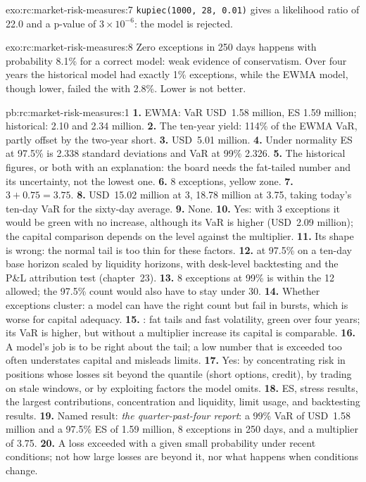 \begin{solution}{exo:rc:market-risk-measures:7}
\texttt{kupiec(1000, 28, 0.01)} gives a likelihood ratio of 22.0 and a p-value of
$3\times10^{-6}$: the model is rejected.
\end{solution}

\begin{solution}{exo:rc:market-risk-measures:8}
Zero exceptions in 250 days happens with probability 8.1\% for a correct model: weak evidence of
conservatism. Over four years the historical model had exactly 1\% exceptions, while the EWMA model,
though lower, failed the  with 2.8\%. Lower is not better.
\end{solution}

\begin{solution}{pb:rc:market-risk-measures:1}
\textbf{1.} EWMA: VaR USD~1.58 million, ES 1.59 million; historical: 2.10 and 2.34 million.
\textbf{2.} The ten-year yield: 114\% of the EWMA VaR, partly offset by the two-year short.
\textbf{3.} USD~5.01 million.
\textbf{4.} Under normality ES at 97.5\% is 2.338 standard deviations and VaR at 99\% 2.326.
\textbf{5.} The historical figures, or both with an explanation: the board needs the fat-tailed
number and its uncertainty, not the lowest one.
\textbf{6.} 8 exceptions, yellow zone.
\textbf{7.} $3+0.75 = 3.75$.
\textbf{8.} USD~15.02 million at 3, 18.78 million at 3.75, taking today's ten-day VaR for the sixty-day average.
\textbf{9.} None.
\textbf{10.} Yes: with 3 exceptions it would be green with no increase, although its VaR is higher
(USD~2.09 million); the capital comparison depends on the level against the multiplier.
\textbf{11.} Its shape is wrong: the normal tail is too thin for these factors.
\textbf{12.}  at 97.5\% on a ten-day base horizon scaled by liquidity horizons,
with desk-level backtesting and the P\&L attribution test (chapter~23).
\textbf{13.} 8 exceptions at 99\% is within the 12 allowed; the 97.5\% count would also have to stay
under 30.
\textbf{14.} Whether exceptions cluster: a model can have the right count but fail in bursts,
which is worse for capital adequacy.
\textbf{15.} : fat tails and fast volatility, green over four
years; its VaR is higher, but without a multiplier increase its capital is comparable.
\textbf{16.} A model's job is to be right about the tail; a low number that is exceeded too often
understates capital and misleads limits.
\textbf{17.} Yes: by concentrating risk in positions whose losses sit beyond the quantile (short
options, credit), by trading on stale windows, or by exploiting factors the model omits.
\textbf{18.} ES, stress results, the largest contributions, concentration and liquidity, limit
usage, and backtesting results.
\textbf{19.} Named result: \emph{the quarter-past-four report}: a 99\% VaR of USD~1.58 million and a
97.5\% ES of 1.59 million, 8 exceptions in 250 days, and a multiplier of 3.75.
\textbf{20.} A loss exceeded with a given small probability under recent conditions; not how large
losses are beyond it, nor what happens when conditions change.
\end{solution}


